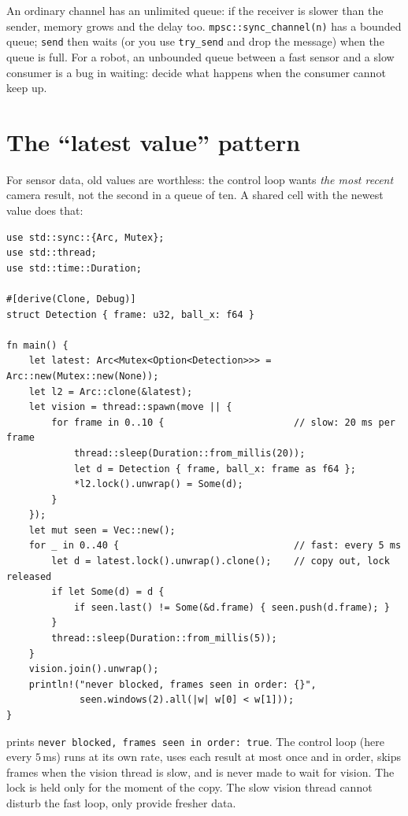 An ordinary channel has an unlimited queue: if the receiver is slower than the sender, memory grows and the delay too. \verb!mpsc::sync_channel(n)! has a bounded queue; \verb!send! then waits (or you use \verb!try_send! and drop the message) when the queue is full. For a robot, an unbounded queue between a fast sensor and a slow consumer is a bug in waiting: decide what happens when the consumer cannot keep up.

\section*{The ``latest value'' pattern}
For sensor data, old values are worthless: the control loop wants \emph{the most recent} camera result, not the second in a queue of ten. A shared cell with the newest value does that:
\begin{verbatim}
use std::sync::{Arc, Mutex};
use std::thread;
use std::time::Duration;

#[derive(Clone, Debug)]
struct Detection { frame: u32, ball_x: f64 }

fn main() {
    let latest: Arc<Mutex<Option<Detection>>> = Arc::new(Mutex::new(None));
    let l2 = Arc::clone(&latest);
    let vision = thread::spawn(move || {
        for frame in 0..10 {                       // slow: 20 ms per frame
            thread::sleep(Duration::from_millis(20));
            let d = Detection { frame, ball_x: frame as f64 };
            *l2.lock().unwrap() = Some(d);
        }
    });
    let mut seen = Vec::new();
    for _ in 0..40 {                               // fast: every 5 ms
        let d = latest.lock().unwrap().clone();    // copy out, lock released
        if let Some(d) = d {
            if seen.last() != Some(&d.frame) { seen.push(d.frame); }
        }
        thread::sleep(Duration::from_millis(5));
    }
    vision.join().unwrap();
    println!("never blocked, frames seen in order: {}",
             seen.windows(2).all(|w| w[0] < w[1]));
}
\end{verbatim}
prints \verb!never blocked, frames seen in order: true!. The control loop (here every $5$\,ms) runs at its own rate, uses each result at most once and in order, skips frames when the vision thread is slow, and is never made to wait for vision. The lock is held only for the moment of the copy. The slow vision thread cannot disturb the fast loop, only provide fresher data.

